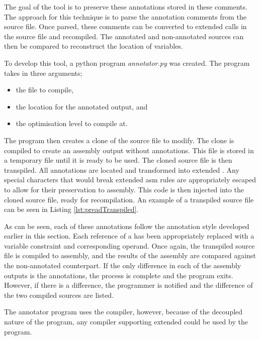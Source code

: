 The goal of the tool is to preserve these annotations stored in these comments. The approach for this technique is to parse the annotation comments from the source file. Once parsed, these comments can be converted to extended  calls in the source file and recompiled. The annotated and non-annotated sources can then be compared to reconstruct the location of variables.

To develop this tool, a python program \textit{annotator.py} was created. The program takes in three arguments;

\begin{itemize}
    \item the file to compile,
    \item the location for the annotated output, and
    \item the optimisation level to compile at. 
\end{itemize}

The program then creates a clone of the source file to modify. The clone is compiled to create an assembly output without annotations. This file is stored in a temporary file until it is ready to be used. The cloned source file is then transpiled. All annotations are located and transformed into extended . Any special characters that would break extended asm rules are appropriately escaped to allow for their preservation to assembly. This code is then injected into the cloned source file, ready for recompilation. An example of a transpiled source file can be seen in Listing \ref{lst:preadTranspiled}.



As can be seen, each of these annotations follow the annotation style developed earlier in this section. Each reference of a  has been appropriately replaced with a variable constraint and corresponding operand. Once again, the transpiled source file is compiled to assembly, and the results of the assembly are compared against the non-annotated counterpart. If the only difference in each of the assembly outputs is the annotations, the process is complete and the program exits. However, if there is a difference, the programmer is notified and the difference of the two compiled sources are listed.

The annotator program uses the  compiler, however, because of the decoupled nature of the program, any compiler supporting extended  could be used by the program. 

